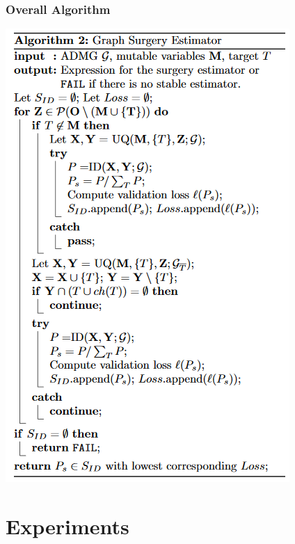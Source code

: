 \documentclass{beamer}
\begin{document}
\begin{frame}
\frametitle{Overall Algorithm}
\centering
\includegraphics[scale=0.45]{figures/alg2.png}

\end{frame}

\section{Experiments}
\end{document}
